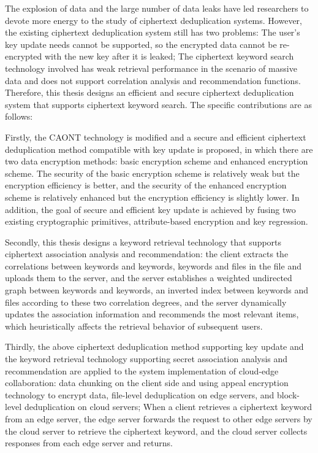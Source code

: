 \documentclass[promaster]{thesis-uestc}
\begin{document}
\begin{englishabstract}

    The explosion of data and the large number of data leaks have led researchers to devote more energy to the study of ciphertext deduplication systems. However, the existing ciphertext deduplication system still has two problems: The user's key update needs cannot be supported, so the encrypted data cannot be re-encrypted with the new key after it is leaked; The ciphertext keyword search technology involved has weak retrieval performance in the scenario of massive data and does not support correlation analysis and recommendation functions. Therefore, this thesis designs an efficient and secure ciphertext deduplication system that supports ciphertext keyword search. The specific contributions are as follows:

    Firstly, the CAONT technology is modified and a secure and efficient ciphertext deduplication method compatible with key update is proposed, in which there are two data encryption methods: basic encryption scheme and enhanced encryption scheme. The security of the basic encryption scheme is relatively weak but the encryption efficiency is better, and the security of the enhanced encryption scheme is relatively enhanced but the encryption efficiency is slightly lower. In addition, the goal of secure and efficient key update is achieved by fusing two existing cryptographic primitives, attribute-based encryption and key regression.

    Secondly, this thesis designs a keyword retrieval technology that supports ciphertext association analysis and recommendation: the client extracts the correlations between keywords and keywords, keywords and files in the file and uploads them to the server, and the server establishes a weighted undirected graph between keywords and keywords, an inverted index between keywords and files according to these two correlation degrees, and the server dynamically updates the association information and recommends the most relevant items, which heuristically affects the retrieval behavior of subsequent users.

    Thirdly,  the above ciphertext deduplication method supporting key update and the keyword retrieval technology supporting secret association analysis and recommendation are applied to the system implementation of cloud-edge collaboration: data chunking on the client side and using appeal encryption technology to encrypt data, file-level deduplication on edge servers, and block-level deduplication on cloud servers; When a client retrieves a ciphertext keyword from an edge server, the edge server forwards the request to other edge servers by the cloud server to retrieve the ciphertext keyword, and the cloud server collects responses from each edge server and returns.


\end{englishabstract}
\end{document}
